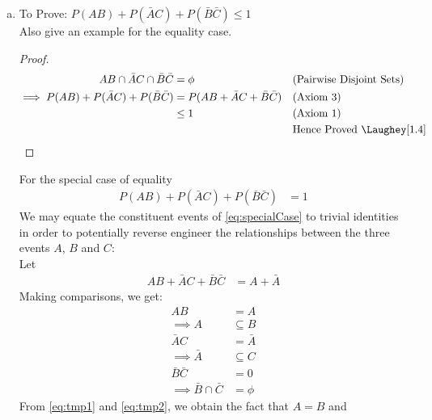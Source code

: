 \begin{enumerate}[a.]
\begin{proof}
\begin{align}
					&= P(A) + P(B) - P(AB) + P(\bar{A}\bar{B}) \nonumber\\
					&= P(A) - P(AB) + P(\bar{A}\bar{B}) + P(B)&& \text{(Rearranging the equation)}\nonumber\\
					&= P(A\bar{B}) + P(\bar{A}\bar{B}) + P(B) &&\text{(Using \cref{eq:totalProbLaw})} \nonumber\\
					&= P(\bar{B}) + P(B) &&\text{(Using \cref{eq:totalProbLawB})} \nonumber\\
					&= 1 &&\text{Hence Proved \Laughey[1.4]}\nonumber
				\end{align}
			\end{proof}	
	\item To Prove: $P(AB) + P(\bar A C) + P(\bar B \bar C) \leq 1$ \\
	Also give an example for the equality case.
	\!
		\begin{proof}
			\begin{align}
				AB \cap \bar{A}C \cap \bar{B}\bar{C} &= \phi && \text{(Pairwise Disjoint Sets)} \nonumber\\
				\implies P(AB) + P(\bar{A}C) + P(\bar{B}\bar{C}) &= P( AB + \bar{A}C + \bar{B}\bar{C} ) && \text{(Axiom 3)} \nonumber\\
				&\leq 1 && \text{(Axiom 1)} \nonumber\\
				&{} && \text{Hence Proved \Laughey[1.4]} \nonumber				
			\end{align}
		\end{proof}
	
		For the special case of equality\\
		\begin{align}
			P(AB) + P(\bar{A}C) + P(\bar{B}\bar{C}) &= 1 \label{eq:specialCase}
		\end{align}
		We may equate the constituent events of \cref{eq:specialCase} to trivial identities in order to potentially reverse engineer the relationships between the three events $A$, $B$ and $C$:\\[5pt]
		Let\\[-20pt]
		\begin{align}
			AB + \bar{A}C + \bar{B}\bar{C} &= A + \bar{A}
		\end{align}
		Making comparisons, we get:
		\begin{align}
			AB &= A \nonumber\\
			\implies A &\subseteq B \label{eq:tmp1}\\
			\bar{A}C &= \bar{A} \nonumber\\
			\implies \bar{A} &\subseteq C \label{eq:tmp2}\\
			\bar{B}\bar{C} &= 0 \nonumber\\
			\implies \bar{B} \cap \bar{C} &= \phi \label{eq:tmp3} 
		\end{align}
		From \cref{eq:tmp1} and \cref{eq:tmp2}, we obtain the fact that $A = B$ and 	
\end{enumerate}